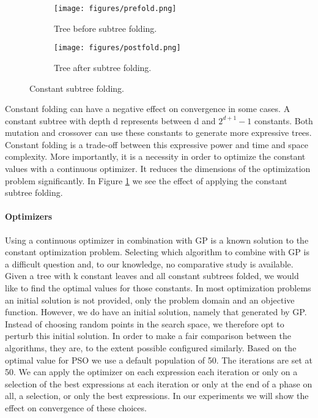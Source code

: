 \begin{figure}
	\centering
    \begin{subfigure}{0.5\textwidth}
    \centering
    \texttt{[image: figures/prefold.png]}
    \caption{Tree before subtree folding.}
	\end{subfigure}
	\begin{subfigure}{0.5\textwidth}
    \centering
    \texttt{[image: figures/postfold.png]}
    \caption{Tree after subtree folding.}
	\end{subfigure}
	    \caption{Constant subtree folding.}
    \label{fig:folding}
\end{figure}
Constant folding can have a negative effect on convergence in some cases. A constant subtree with depth d represents between d and $2^{d+1}-1$ constants. Both mutation and crossover can use these constants to generate more expressive trees. Constant folding is a trade-off between this expressive power and time and space complexity. More importantly, it is a necessity in order to optimize the constant values with a continuous optimizer. It reduces the dimensions of the optimization problem significantly. In Figure \ref{fig:folding} we see the effect of applying the constant subtree folding. 
\paragraph{Optimizers}
Using a continuous optimizer in combination with GP is a known solution \cite{GEDE, GPConst} to the constant optimization problem.
Selecting which algorithm to combine with GP is a difficult question and, to our knowledge, no comparative study is available. Given a tree with k constant leaves and all constant subtrees folded, we would like to find the optimal values for those constants. In most optimization problems an initial solution is not provided, only the problem domain and an objective function. However, we do have an initial solution, namely that generated by GP. Instead of choosing random points in the search space, we therefore opt to perturb this initial solution. In order to make a fair comparison between the algorithms, they are, to the extent possible configured similarly. Based on the optimal value for PSO \cite{PSO} we use a default population of 50. The iterations are set at 50. We can apply the optimizer on each expression each iteration or only on a selection of the best expressions at each iteration or only at the end of a phase on all, a selection, or only the best expressions. In our experiments we will show the effect on convergence of these choices.
